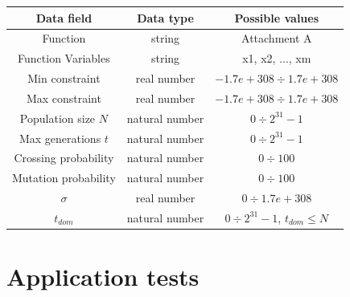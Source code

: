 \documentclass[11pt]{article}
\begin{document}
	\begin{center}
	\begin{tabular}{| c | c | c |}
		\hline
		\textbf{Data field} & \textbf{Data type} & \textbf{Possible values}\\
		\hline
		Function & string & Attachment A\\ \hline
		Function Variables & string & x1, x2, ..., xm \\ \hline
		Min constraint & real number & $-1.7e+308 \div 1.7e+308$\\ \hline
		Max constraint & real number & $-1.7e+308 \div 1.7e+308$\\ \hline
		Population size $N$ & natural number & $0 \div 2^{31}-1$ \\ \hline
		Max generations $t$ & natural number & $0 \div 2^{31}-1$ \\ \hline
		Crossing probability & natural number & $0 \div 100$ \\ \hline
		Mutation probability & natural number & $0 \div 100$ \\ \hline
		$\sigma$ & real number & $0 \div 1.7e+308$ \\ \hline
		$t_{dom}$ & natural number & $0 \div 2^{31}-1$, $t_{dom} \leq N$ \\
		\hline
	\end{tabular}			
	\end{center}
	
	\newpage
	\section{Application tests}
	
\end{document}
